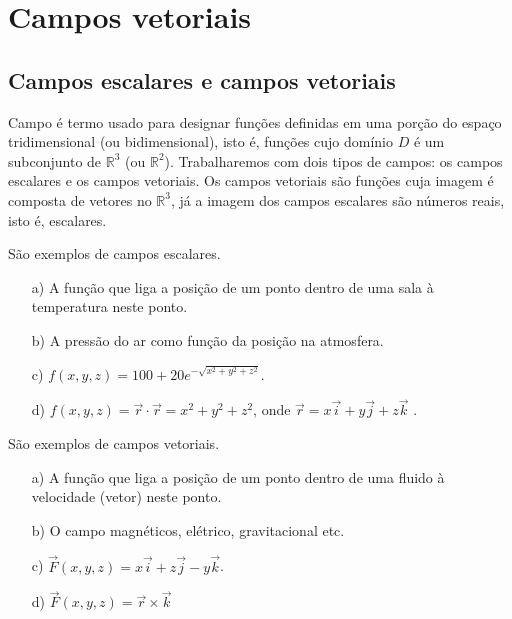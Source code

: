 
\chapter{Campos vetoriais}\label{cap:campos}


\section{Campos escalares e campos vetoriais}
 Campo é termo usado para designar funções definidas em uma porção do espaço tridimensional (ou bidimensional), isto é, funções cujo domínio $D$ é um subconjunto de $\mathbb{R}^3$ (ou $\mathbb{R}^2$). Trabalharemos com dois tipos de campos: os campos escalares e os campos vetoriais. Os campos vetoriais são funções cuja imagem é composta de vetores no $\mathbb{R}^3$, já a imagem dos campos escalares são números reais, isto é, escalares.

\begin{ex}\label{excampos} São exemplos de campos escalares.
\begin{itemize}
\item [a)] A função que liga a posição de um ponto dentro de uma sala à temperatura neste ponto.
\item [b)] A pressão do ar como função da posição na atmosfera.
\item [c)] $f(x,y,z)= 100 + 20e^{-\sqrt{x^2+y^2+z^2}}$.
\item [d)] $f(x,y,z)= \vec{r} \cdot \vec{r} = x^2+y^2+z^2$, onde $\vec{r}=x\vec{i}+y\vec{j}+z\vec{k}$ .
\end{itemize}
\end{ex}


\begin{ex}\label{excampos_1} São exemplos de campos vetoriais.
\begin{itemize}
\item [a)] A função que liga a posição de um ponto dentro de uma fluido à velocidade (vetor) neste ponto.
\item [b)] O campo magnéticos, elétrico, gravitacional etc.
\item [c)] $\vec{F}(x,y,z)= x\vec{i} + z\vec{j} - y\vec{k}$.
\item [d)] $\vec{F}(x,y,z)= \vec{r}\times \vec{k}$
\end{itemize}
\end{ex}

